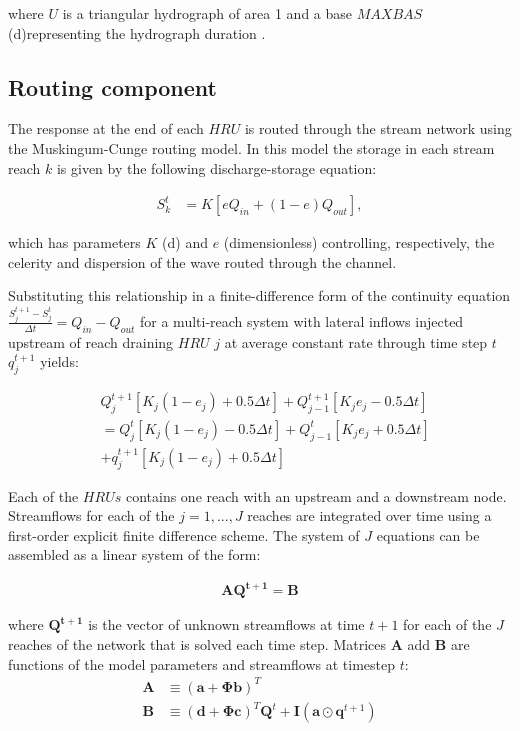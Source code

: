 \noindent where $U$ is a triangular hydrograph of area \num{1} and a base $MAXBAS$ (\si{\day})representing the hydrograph duration . 

\subsection{Routing component}

The response at the end of each $HRU$ is routed through the stream network using the Muskingum-Cunge routing model. In this model the storage in each stream reach $k$ is given by the following discharge-storage equation:

\begin{align}
S_k^t &= K\left[eQ_{in} + (1 - e)Q_{out} \right],
\end{align}

which has parameters $K$ (\si{\day}) and $e$ (dimensionless) controlling, respectively, the celerity and dispersion of the wave routed through the channel.

Substituting this relationship in a finite-difference form of the continuity equation $\frac{S_j^{t+1} - S_j^{t}}{\Delta t} = Q_{in} - Q_{out}$ for a multi-reach system with lateral inflows injected upstream of reach draining $HRU$ $j$ at average constant rate through time step $t$ $q_{j}^{t+1}$ yields:

\begin{align}
&Q_j^{t+1}\left[K_j(1 - e_j) + 0.5\Delta t  \right] + Q_{j-1}^{t+1}\left[K_je_j - 0.5\Delta t  \right]  \\
&= Q_j^{t}\left[K_j(1 - e_j) - 0.5\Delta t  \right] + Q_{j-1}^{t}\left[K_je_j + 0.5\Delta t  \right]\\
&+ q_{j}^{t+1}\left[K_j(1 - e_j) + 0.5\Delta t  \right]
\end{align}

Each of the $HRUs$ contains one reach with an upstream and a downstream node. Streamflows for each of the $j=1,...,J$ reaches are integrated over time using a first-order explicit finite difference scheme. The system of $J$ equations can be assembled as a linear system of the form:   

\begin{align}\label{eq:linearsystem}
\mathbf{A}\mathbf{Q^{t+1}} = \mathbf{B}
\end{align}

where $\mathbf{Q^{t+1}}$ is the vector of unknown streamflows at time $t+1$ for each of the $J$ reaches of the network that is solved each time step. Matrices $\mathbf{A}$ add $\mathbf{B}$ are functions of the model parameters and streamflows at timestep $t$:
\begin{align}
\mathbf{A}&\equiv (\mathbf{a} + \mathbf{\Phi} \mathbf{b})^T\\
\mathbf{B}&\equiv (\mathbf{d} + \mathbf{\Phi}\mathbf{c})^T\mathbf{Q}^t + \mathbf{I}(\mathbf{a\odot q}^{t+1})
\end{align}

